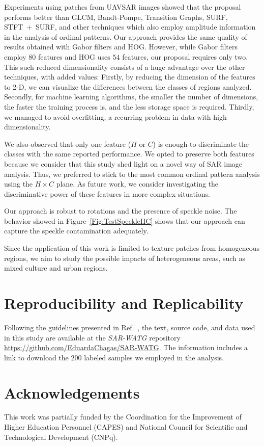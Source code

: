 \documentclass[journal]{IEEEtran}
\begin{document}
Experiments using patches from UAVSAR images showed that the proposal performs better than GLCM, Bandt-Pompe, Transition Graphs, SURF, \mbox{STFT + SURF}, and other techniques which also employ amplitude information in the analysis of ordinal patterns. 
Our approach provides the same quality of results obtained with Gabor filters and HOG.
However, while Gabor filters employ $80$ features and HOG uses $54$ features, our proposal requires only two.
This such reduced dimensionality consists of a huge advantage over the other techniques, with added values:
Firstly, by reducing the dimension of the features to \mbox{2-D}, we can visualize the differences between the classes of regions analyzed.
Secondly, for machine learning algorithms, the smaller the number of dimensions, the faster the training process is, and the less storage space is required.
Thirdly, we managed to avoid overfitting, a recurring problem in data with high dimensionality.

We also observed that only one feature ($H$ or $C$) is enough to discriminate the classes with the same reported performance. We opted to preserve both features because we consider that this study shed light on a novel way of SAR image analysis. Thus, we preferred to stick to the most common ordinal pattern analysis using the $H \times C $ plane. As future work, we consider investigating the discriminative power of these features in more complex situations.

Our approach is robust to rotations and the presence of speckle noise. The behavior showed in Figure~\ref{Fig:TestSpeckleHC} shows that our approach can capture the speckle contamination adequately.

Since the application of this work is limited to texture patches from homogeneous regions, we aim to study the possible impacts of heterogeneous areas, such as mixed culture and urban regions.

\section{Reproducibility and Replicability} 

Following the guidelines presented in Ref.~\cite{ABadgingSystemforReproducibilityandReplicabilityinRemoteSensingResearch}, the text, source code, and data used in this study are available at the \textit{SAR-WATG} repository \url{https://github.com/EduardaChagas/SAR-WATG}.
The information includes a link to download the $200$ labeled samples we employed in the analysis.




\section*{Acknowledgements}\label{ACKNOWLEDGEMENTS}

This work was partially funded by the Coordination for the Improvement of Higher Education Personnel (CAPES) and National Council for Scientific and Technological Development (CNPq).
\end{document}
